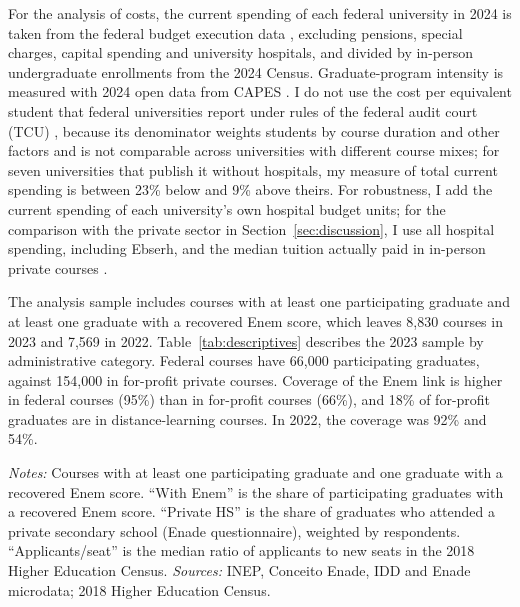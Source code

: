 \documentclass[12pt,letterpaper]{article}
\begin{document}
For the analysis of costs, the current spending of each federal university in 2024 is taken from the federal budget execution data \citep{cgu2024}, excluding pensions, special charges, capital spending and university hospitals, and divided by in-person undergraduate enrollments from the 2024 Census. Graduate-program intensity is measured with 2024 open data from CAPES \citep{capes2024}. I do not use the cost per equivalent student that federal universities report under rules of the federal audit court (TCU) \citep{tcu2002}, because its denominator weights students by course duration and other factors \citep{tcu2010} and is not comparable across universities with different course mixes; for seven universities that publish it without hospitals, my measure of total current spending is between 23\% below and 9\% above theirs. For robustness, I add the current spending of each university's own hospital budget units; for the comparison with the private sector in Section~\ref{sec:discussion}, I use all hospital spending, including Ebserh, and the median tuition actually paid in in-person private courses \citep{hoper2026}.

The analysis sample includes courses with at least one participating graduate and at least one graduate with a recovered Enem score, which leaves 8,830 courses in 2023 and 7,569 in 2022. Table~\ref{tab:descriptives} describes the 2023 sample by administrative category. Federal courses have 66,000 participating graduates, against 154,000 in for-profit private courses. Coverage of the Enem link is higher in federal courses (95\%) than in for-profit courses (66\%), and 18\% of for-profit graduates are in distance-learning courses. In 2022, the coverage was 92\% and 54\%.

\begin{table}[!htbp]
\centering\footnotesize
\caption{Courses and graduates by administrative category, Enade 2023}\label{tab:descriptives}
\resizebox{\linewidth}{!}{}
\begin{minipage}{\linewidth}\vspace{0.4em}\scriptsize
\textit{Notes:} Courses with at least one participating graduate and one graduate with a recovered Enem score. ``With Enem'' is the share of participating graduates with a recovered Enem score. ``Private HS'' is the share of graduates who attended a private secondary school (Enade questionnaire), weighted by respondents. ``Applicants/seat'' is the median ratio of applicants to new seats in the 2018 Higher Education Census. \textit{Sources:} INEP, Conceito Enade, IDD and Enade microdata; 2018 Higher Education Census.
\end{minipage}
\end{table}
\end{document}
